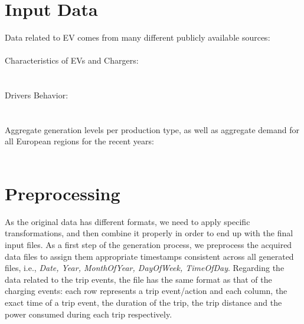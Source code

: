 \documentclass{article}
\begin{document}
\begin{multicols}{3}
\vspace{.3cm}
\section*{Input Data}
Data related to EV comes from many different publicly available sources:\\ 
$\mbox{     }$\\
Characteristics of EVs and Chargers: \\   \\ %
$\mbox{     }$\\
Drivers Behavior: \\\\
$\mbox{     }$\\
Aggregate generation levels per production type, as well as aggregate demand for all European regions for the recent years: \\\\ 

\vspace{-.5cm}

\section*{Preprocessing}
As the original data has different formats, we need to apply specific transformations, and then combine it properly in order to end up with the final input files. As a first step of the generation process, we preprocess the acquired data files to assign them appropriate timestamps  
consistent across all generated files, i.e., \emph{Date, Year, MonthOfYear, DayOfWeek, TimeOfDay}.
Regarding the data related to the trip events, the file has the same format as that of the charging events: each row represents a trip event/action and each column, the exact time of a trip event, the duration of the trip, the trip distance and the power consumed during each trip respectively. 


\end{multicols}
\end{document}
